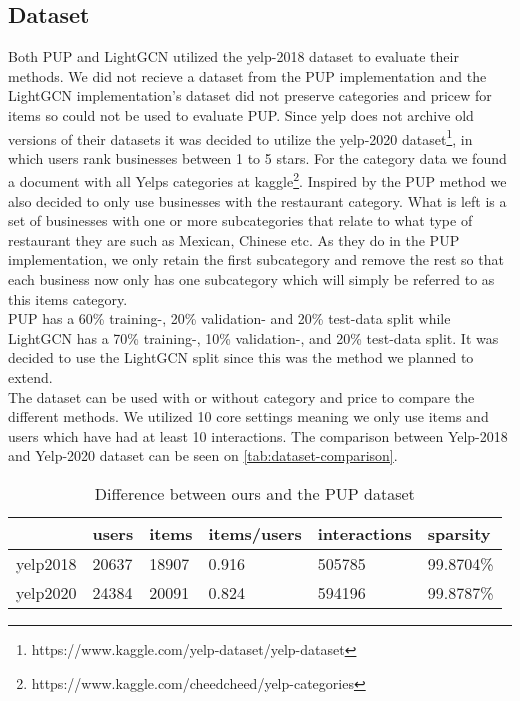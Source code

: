 \subsection{Dataset} \label{equal-data}
Both PUP and LightGCN utilized the yelp-2018 dataset to evaluate their methods.
We did not recieve a dataset from the PUP implementation and the LightGCN implementation's dataset did not preserve categories and pricew for items so could not be used to evaluate PUP.
Since yelp does not archive old versions of their datasets it was decided to utilize the yelp-2020 dataset\footnote{https://www.kaggle.com/yelp-dataset/yelp-dataset}, in which users rank businesses between 1 to 5 stars.
For the category data we found a document with all Yelps categories at kaggle\footnote{https://www.kaggle.com/cheedcheed/yelp-categories}.
Inspired by the PUP method we also decided to only use businesses with the restaurant category.
What is left is a set of businesses with one or more subcategories that relate to what type of restaurant they are such as Mexican, Chinese etc.
As they do in the PUP implementation, we only retain the first subcategory and remove the rest so that each business now only has one subcategory which will simply be referred to as this items category.
\\
PUP has a 60\% training-, 20\% validation- and 20\% test-data split while LightGCN has a 70\% training-, 10\% validation-, and 20\% test-data split.
It was decided to use the LightGCN split since this was the method we planned to extend.
\\
The dataset can be used with or without category and price to compare the different methods.
We utilized 10 core settings meaning we only use items and users which have had at least 10 interactions.
The comparison between Yelp-2018 and Yelp-2020 dataset can be seen on \autoref{tab:dataset-comparison}.
\begin{table*}[]
    \centering
    \begin{tabular}{|l|l|l|l|l|l|}
    \hline
                 & users & items & items/users & interactions & sparsity  \\ \hline
        yelp2018 & 20637 & 18907 & 0.916       & 505785       & 99.8704\% \\ \hline
        yelp2020 & 24384 & 20091 & 0.824       & 594196       & 99.8787\% \\ \hline
    \end{tabular}
    \caption{Difference between ours and the PUP dataset}
    \label{tab:dataset-comparison}
\end{table*}

